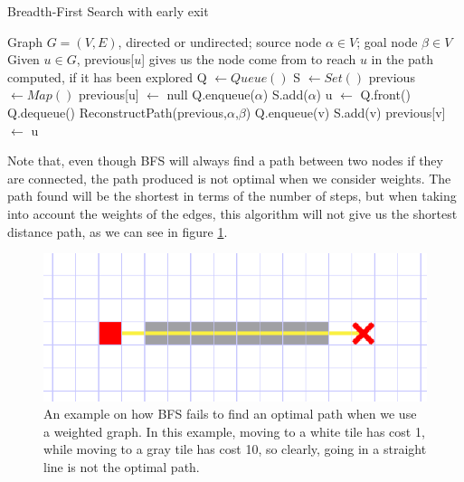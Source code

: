 \documentclass[12pt]{report}
\begin{document}
\begin{algorithm}
\caption{Breadth-First Search with early exit}
\label{alg:bfs_early_exit}
\begin{algorithmic}[1]
\Require Graph $G = (V, E)$, directed or undirected; source node $\alpha \in V$; goal node $\beta \in V$
\Ensure Given $u \in G$, previous[$u$] gives us the node come from to reach $u$ in the path computed, if it has been explored
\State Q $\gets Queue()$
\State S $\gets Set()$
\State previous $\gets Map()$
	\State previous[u] $\gets$ null
\EndFor
\State Q.enqueue($\alpha$)
\State S.add($\alpha$)
	\State u $\gets$ Q.front()
	\State Q.dequeue()
			 
				\State \Return ReconstructPath(previous,$\alpha$,$\beta$)
			\EndIf
			\State Q.enqueue(v)
			\State S.add(v)
			\State previous[v] $\gets$ u
		\EndIf
	\EndFor
\EndWhile
\EndProcedure
\end{algorithmic}
\end{algorithm}

Note that, even though BFS will always find a path between two nodes if they are connected, the path produced is not optimal when we consider weights. The path found will be the shortest in terms of the number of steps, but when taking into account the weights of the edges, this algorithm will not give us the shortest distance path, as we can see in figure \ref{fig:bfs-fail}.

\begin{figure}
\centering
\includegraphics[width=1\linewidth]{bfs-fail}
\caption{An example on how BFS fails to find an optimal path when we use a weighted graph. In this example, moving to a white tile has cost 1, while moving to a gray tile has cost 10, so clearly, going in a straight line is not the optimal path.}
\label{fig:bfs-fail}
\end{figure}
\end{document}
